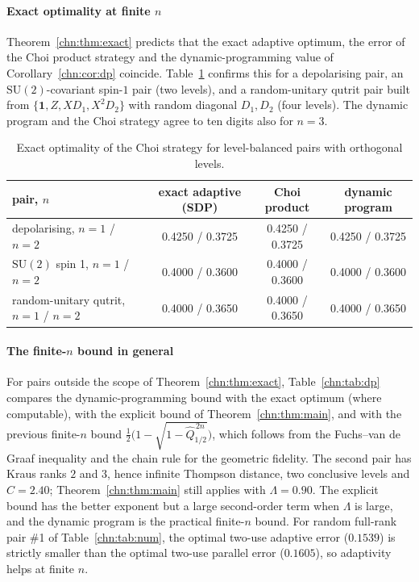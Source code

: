 \paragraph{Exact optimality at finite $n$} Theorem~\ref{chn:thm:exact} predicts that the exact adaptive optimum, the error of the Choi product strategy and the dynamic-programming value of Corollary~\ref{chn:cor:dp} coincide. Table~\ref{chn:tab:exact} confirms this for a depolarising pair, an $\mathrm{SU}(2)$-covariant spin-$1$ pair (two levels), and a random-unitary qutrit pair built from $\{\mathbf 1,Z,XD_1,X^2D_2\}$ with random diagonal $D_1,D_2$ (four levels). The dynamic program and the Choi strategy agree to ten digits also for $n=3$.

\begin{table}[!tbp]
\centering
\small
\setlength{\tabcolsep}{3pt}
\begin{tabular}{lccc}
\toprule
pair, $n$ & exact adaptive (SDP) & Choi product & dynamic program\\
\midrule
depolarising, $n=1$ / $n=2$ & 0.4250 / 0.3725 & 0.4250 / 0.3725 & 0.4250 / 0.3725\\
$\mathrm{SU}(2)$ spin 1, $n=1$ / $n=2$ & 0.4000 / 0.3600 & 0.4000 / 0.3600 & 0.4000 / 0.3600\\
random-unitary qutrit, $n=1$ / $n=2$ & 0.4000 / 0.3650 & 0.4000 / 0.3650 & 0.4000 / 0.3650\\
\bottomrule
\end{tabular}
\caption{Exact optimality of the Choi strategy for level-balanced pairs with orthogonal levels.}
\label{chn:tab:exact}
\end{table}

\paragraph{The finite-$n$ bound in general} For pairs outside the scope of Theorem~\ref{chn:thm:exact}, Table~\ref{chn:tab:dp} compares the dynamic-programming bound with the exact optimum (where computable), with the explicit bound of Theorem~\ref{chn:thm:main}, and with the previous finite-$n$ bound $\tfrac12\big(1-\sqrt{1-\widehat Q_{1/2}^{\,2n}}\big)$, which follows from the Fuchs--van de Graaf inequality and the chain rule for the geometric fidelity. The second pair has Kraus ranks $2$ and $3$, hence infinite Thompson distance, two conclusive levels and $\widehat C=2.40$; Theorem~\ref{chn:thm:main} still applies with $\Lambda=0.90$. The explicit bound has the better exponent but a large second-order term when $\Lambda$ is large, and the dynamic program is the practical finite-$n$ bound. For random full-rank pair \#1 of Table~\ref{chn:tab:num}, the optimal two-use adaptive error ($0.1539$) is strictly smaller than the optimal two-use parallel error ($0.1605$), so adaptivity helps at finite $n$.


